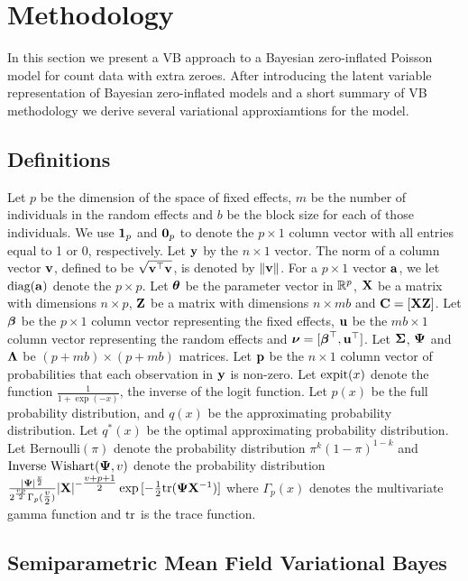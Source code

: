 \documentclass[times, doublespace]{anzsauth}
\begin{document}
\section{Methodology}
\label{sec:methodology}

In this section we present a VB approach to a Bayesian zero-inflated Poisson model for count data with extra
zeroes. After introducing the latent variable representation of Bayesian zero-inflated models and a short summary 
of VB methodology we derive several variational approxiamtions for the model.

\subsection{Definitions}

Let $p$ be the dimension of the space of fixed effects, $m$ be the number of individuals in the random effects
and $b$ be the block size for each of those individuals.
We use ${\bf 1}_p$ and ${\bf 0}_p$ to denote the $p \times 1$ column vector with all entries equal to 1 or 0,
respectively.
Let ${\bf y}$ by the $n \times 1$ vector.
The norm of a column vector ${\bf v}$, defined to be $\sqrt{{\bf v}^\top {\bf v}}$, is denoted by $\|{\bf v}\|$.
For a $p \times 1$ vector ${\bf a}$, we let $\text{diag}{({\bf a})}$ denote the $p \times p$.
Let ${\boldsymbol \theta}$ be the parameter vector in ${\mathbb{R}}^p$,
${\bf X}$ be a matrix with dimensions $n \times p$,
${\bf Z}$ be a matrix with dimensions $n \times m b$
and ${\bf C} = [ {\bf X} {\bf Z} ]$.
Let ${\boldsymbol \beta}$ be the $p \times 1$ column vector representing the fixed effects,
${\bf u}$ be the $m b \times 1$ column vector representing the random effects
and ${\boldsymbol \nu} = [{\boldsymbol \beta}^\top, {\bf u}^\top]$.
Let ${\boldsymbol \Sigma}$, ${\boldsymbol \Psi}$ and ${\boldsymbol \Lambda}$ be $(p + m b) \times (p + m b)$ matrices.
Let ${\bf p}$ be the $n \times 1$ column vector of probabilities that each observation in ${\bf y}$ is non-zero.
Let $\text{expit} (x)$ denote the function $\tfrac{1}{1 + \exp(-x)}$, the inverse of the logit function.
Let $p(x)$ be the full probability distribution, and $q(x)$ be the approximating probability distribution.
Let $q^*(x)$ be the optimal approximating probability distribution.
Let $\text{Bernoulli}(\pi)$  denote the probability distribution $\pi^k (1 - \pi)^{1-k}$
and $\text{Inverse Wishart}({\boldsymbol \Psi}, v)$ denote the probability distribution
$\tfrac{|{\boldsymbol \Psi}|^\frac{v}{2}}{2^{\frac{vp}{2}} \Gamma_p{(\tfrac{v}{2})}} |{\bf X}|^{-\tfrac{v + p + 1}{2}} \exp{[- \tfrac{1}{2} \text{tr}{({\boldsymbol\Psi}{\bf X}^{-1})}]}$ where $\Gamma_p{(x)}$ denotes the multivariate gamma function and
$\text{tr}$ is the trace function.


\subsection{Semiparametric Mean Field Variational Bayes}
\end{document}
